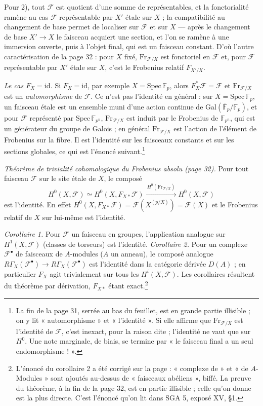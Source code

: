 \documentclass[11pt,a4paper]{article}
\begin{document}
Pour 2), tout $\mathcal{F}$ est quotient d'une somme de représentables, et la
fonctorialité ramène au cas $\mathcal{F}$ représentable par $X'$ étale sur
$X$ ; la compatibilité au changement de base permet de localiser sur
$\mathcal{F}$ et sur $X$ — après le changement de base $X' \to X$ le faisceau
acquiert une section, et l'on se ramène à une immersion ouverte, puis à
l'objet final, qui est un faisceau constant. D'où l'autre caractérisation de
la page 32 : pour $X$ fixé, $\mathrm{Fr}_{\mathcal{F}/X}$ est fonctoriel en
$\mathcal{F}$ et, pour $\mathcal{F}$ représentable par $X'$ étale sur $X$, c'est
le Frobenius relatif $F_{X'/X}$.

\emph{Le cas $F_X = \mathrm{id}$.} Si $F_X = \mathrm{id}$, par exemple $X =
\mathrm{Spec}\,\mathbb{F}_p$, alors $F_X^{*}\mathcal{F} = \mathcal{F}$ et
$\mathrm{Fr}_{\mathcal{F}/X}$ est un \emph{automorphisme} de $\mathcal{F}$. Ce
n'est pas l'identité en général : sur $X = \mathrm{Spec}\,\mathbb{F}_p$, un
faisceau étale est un ensemble muni d'une action continue de
$\mathrm{Gal}(\overline{\mathbb{F}}_p/\mathbb{F}_p)$, et pour $\mathcal{F}$
représenté par $\mathrm{Spec}\,\mathbb{F}_{p^{n}}$, $\mathrm{Fr}_{\mathcal{F}/X}$
est induit par le Frobenius de $\mathbb{F}_{p^{n}}$, qui est un générateur du
groupe de Galois ; en général $\mathrm{Fr}_{\mathcal{F}/X}$ est l'action de
l'élément de Frobenius sur la fibre. Il est l'identité sur les faisceaux
constants et sur les sections globales, ce qui est l'énoncé
suivant.\footnote{La fin de la page 31, serrée au bas du feuillet, est en
grande partie illisible ; on y lit « automorphisme » et « l'identité ». Si
elle affirme que $\mathrm{Fr}_{\mathcal{F}/X}$ est l'identité de $\mathcal{F}$,
c'est inexact, pour la raison dite ; l'identité ne vaut que sur $H^0$. Une note
marginale, de biais, se termine par « le faisceau final a un seul endomorphisme ! ».}

\emph{Théorème de trivialité cohomologique du Frobenius absolu (page 32).} Pour
tout faisceau $\mathcal{F}$ sur le site étale de $X$, le composé
\[
H^0(X, \mathcal{F}) \simeq H^0(X, F_{X*}\mathcal{F})
\xrightarrow{\ H^0(\mathrm{Fr}_{\mathcal{F}/X})\ } H^0(X, \mathcal{F})
\]
est l'identité. En effet $H^0(X, F_{X*}\mathcal{F}) = \mathcal{F}(X^{(p/X)})
= \mathcal{F}(X)$ et le Frobenius relatif de $X$ sur lui-même est l'identité.

\emph{Corollaire 1.} Pour $\mathcal{F}$ un faisceau en groupes, l'application
analogue sur $H^1(X, \mathcal{F})$ (classes de torseurs) est l'identité.
\emph{Corollaire 2.} Pour un complexe $\mathcal{F}^{\bullet}$ de faisceaux de
$A$-modules ($A$ un anneau), le composé analogue $R\Gamma_X(\mathcal{F}^{\bullet})
\to R\Gamma_X(\mathcal{F}^{\bullet})$ est l'identité dans la catégorie dérivée
$D(A)$ ; en particulier $F_X$ agit trivialement sur tous les $H^{i}(X,
\mathcal{F})$. Les corollaires résultent du théorème par dérivation, $F_{X*}$
étant exact.\footnote{L'énoncé du corollaire 2 a été corrigé sur la page :
« complexe de » et « de $A$-Modules » sont ajoutés au-dessus de « faisceaux
abéliens », biffé. La preuve du théorème, à la fin de la page 32, est en
partie illisible ; celle qu'on donne est la plus directe. C'est l'énoncé qu'on
lit dans SGA 5, exposé XV, §1.}
\end{document}
